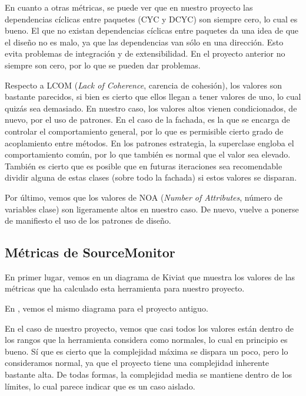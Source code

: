 En cuanto a otras métricas, se puede ver que en nuestro proyecto las dependencias cíclicas entre paquetes (CYC y DCYC) son siempre cero, lo cual es bueno. El que no existan dependencias cíclicas entre paquetes da una idea de que el diseño no es malo, ya que las dependencias van sólo en una dirección. Esto evita problemas de integración y de extensibilidad. En el proyecto anterior no siempre son cero, por lo que se pueden dar problemas.

Respecto a LCOM (\textit{Lack of Coherence}, carencia de cohesión), los valores son bastante parecidos, si bien es cierto que ellos llegan a tener valores de uno, lo cual quizás sea demasiado. En nuestro caso, los valores altos vienen condicionados, de nuevo, por el uso de patrones. En el caso de la fachada, es la que se encarga de controlar el comportamiento general, por lo que es permisible cierto grado de acoplamiento entre métodos. En los patrones estrategia, la superclase engloba el comportamiento común, por lo que también es normal que el valor sea elevado. También es cierto que es posible que en futuras iteraciones sea recomendable dividir alguna de estas clases (sobre todo la fachada) si estos valores se disparan.

Por último, vemos que los valores de NOA (\textit{Number of Attributes}, número de variables clase) son ligeramente altos en nuestro caso. De nuevo, vuelve a ponerse de manifiesto el uso de los patrones de diseño.

\subsection{Métricas de SourceMonitor}
En primer lugar, vemos en  un diagrama de Kiviat que muestra los valores de las métricas que ha calculado esta herramienta para nuestro proyecto.


En , vemos el mismo diagrama para el proyecto antiguo.


En el caso de nuestro proyecto, vemos que casi todos los valores están dentro de los rangos que la herramienta considera como normales, lo cual en principio es bueno. Sí que es cierto que la complejidad máxima se dispara un poco, pero lo consideramos normal, ya que el proyecto tiene una complejidad inherente bastante alta. De todas formas, la complejidad media se mantiene dentro de los límites, lo cual parece indicar que es un caso aislado.


